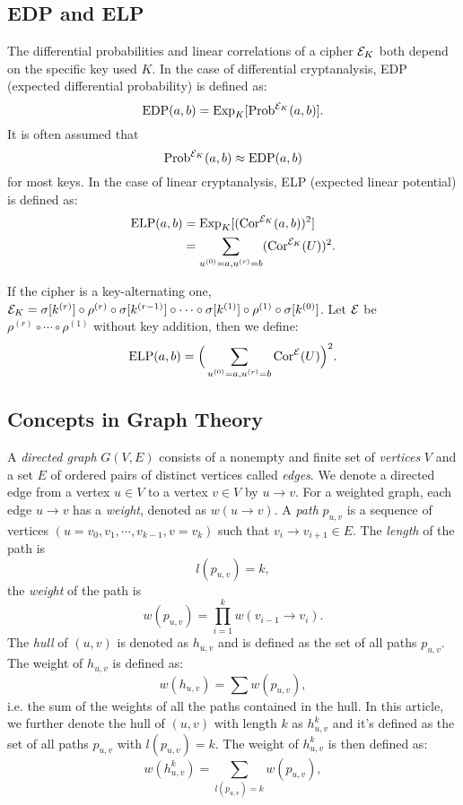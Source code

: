 \subsection{EDP and ELP}
The differential probabilities and linear correlations of a cipher $\mathcal{E}_K$ both depend on the specific key used $K$. In the case of differential cryptanalysis, EDP (expected differential probability) is defined as:
\[
    \text{EDP}(a,b)=\text{Exp}_{K}[\text{Prob}^{\mathcal{E}_K}(a,b)].
\]
It is often assumed that
\[
    \text{Prob}^{\mathcal{E}_K}(a,b)\approx\text{EDP}(a,b)
\]
for most keys. In the case of linear cryptanalysis, ELP (expected linear potential) is defined as:
\begin{align*}
    \text{ELP}(a,b)&=\text{Exp}_{K}[(\text{Cor}^{\mathcal{E}_K}(a,b))^2]\\
    &=\sum\limits_{u^{(0)}=a,u^{(r)}=b}(\text{Cor}^{\mathcal{E}_K}(U))^2.
\end{align*}
    

If the cipher is a key-alternating one, $\mathcal{E}_K=\sigma[k^{(r)}]\circ\rho^{(r)}\circ\sigma[k^{(r-1)}]\circ\cdots\circ\sigma[k^{(1)}]\circ\rho^{(1)}\circ\sigma[k^{(0)}]$. Let $\mathcal{E}$ be $\rho^{(r)}\circ\cdots\circ\rho^{(1)}$ without key addition, then we define:
\[
    \text{ELP}(a,b)=\Big(\sum\limits_{u^{(0)}=a,u^{(r)}=b}\text{Cor}^{\mathcal{E}}(U)\Big)^2.
\]


\subsection{Concepts in Graph Theory}

A \textit{directed graph} $G(V, E)$ consists of a nonempty and finite set of \textit{vertices} $V$ and a set $E$ of ordered pairs of distinct vertices called \textit{edges}. We denote a directed edge from a vertex $u\in V$ to a vertex $v\in V$ by $u\rightarrow v$. For a weighted graph, each edge $u\rightarrow v$ has a \textit{weight}, denoted as $w(u\rightarrow v)$. A \textit{path} $p_{u,v}$ is a sequence of vertices $(u=v_0,v_1,\cdots,v_{k-1},v=v_k)$ such that $v_i\rightarrow v_{i+1}\in E$. The \textit{length} of the path is
\[
    l(p_{u,v})=k,
\]
the \textit{weight} of the path is
\[
    w(p_{u,v})=\prod\limits_{i=1}^{k}w(v_{i-1}\rightarrow v_i).
\]
The \textit{hull} of $(u,v)$ is denoted as $h_{u,v}$ and is defined as the set of all paths $p_{u,v}$. The weight of $h_{u,v}$ is defined as:
\[
    w(h_{u,v})=\sum w(p_{u,v}),
\]
i.e. the sum of the weights of all the paths contained in the hull. In this article, we further denote the hull of $(u,v)$ with length $k$ as $h_{u,v}^k$ and it's defined as the set of all paths $p_{u,v}$ with $l(p_{u,v})=k$. The weight of $h_{u,v}^k$ is then defined as:
\[
    w(h_{u,v}^k)=\sum\limits_{l(p_{u,v})=k} w(p_{u,v}),
\]

